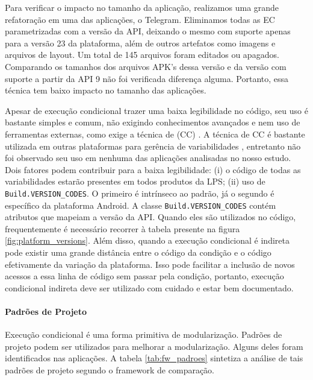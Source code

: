 Para verificar o impacto no tamanho da aplicação, realizamos uma grande refatoração
em uma das aplicações, o Telegram. Eliminamos todas as EC parametrizadas com a versão
da API, deixando o mesmo com suporte apenas para a versão 23 da plataforma, além de
outros artefatos como imagens e arquivos de layout. Um total de 145 arquivos foram 
editados ou
apagados. Comparando os tamanhos dos arquivos APK's dessa versão e da versão com suporte
a partir da API 9 não foi verificada diferença alguma. Portanto, essa técnica tem baixo
impacto no tamanho das aplicações.

Apesar de execução condicional trazer uma baixa legibilidade no código, seu uso
é bastante simples e comum, não exigindo conhecimentos avançados e nem uso de
ferramentas externas, como exige a técnica de 
(CC)
\cite{Medeiros2015}. A técnica de CC é bastante utilizada em outras plataformas
para gerência de variabilidades \cite{Liebig2010}, entretanto não foi observado
seu uso em nenhuma das aplicações analisadas no nosso estudo. Dois fatores podem
contribuir para a baixa legibilidade: (i) o código de todas as variabilidades
estarão presentes em todos produtos da LPS; (ii) uso de \texttt{Build.VERSION\_CODES}.
O primeiro é intrínseco ao padrão, já o segundo é específico da plataforma Android.
A classe \texttt{Build.VERSION\_CODES} contém atributos que mapeiam a versão da API.
Quando eles são utilizados no código, frequentemente é necessário recorrer à tabela
presente na figura \ref{fig:platform_versions}. Além disso, quando a execução
condicional é indireta pode existir uma grande distância entre o código da condição
e o código efetivamente da variação da plataforma. Isso pode facilitar a inclusão de
novos acessos a essa linha de código sem passar pela condição, portanto, execução
condicional indireta deve ser utilizado com cuidado e estar bem documentado.

\paragraph{Padrões de Projeto}
Execução condicional é uma forma primitiva de modularização. Padrões de projeto
podem ser utilizados para melhorar a modularização. Alguns deles foram identificados
nas aplicações. A tabela \ref{tab:fw_padroes} sintetiza a análise de tais padrões de
projeto segundo o framework de comparação.

